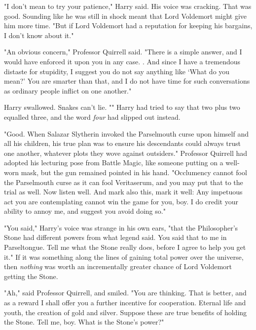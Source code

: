 "I don't mean to try your patience," Harry said. His voice was cracking. That 
was good. Sounding like he was still in shock meant that Lord Voldemort might 
give him more time. "But if Lord Voldemort had a reputation for keeping his 
bargains, I don't know about it."

"An obvious concern," Professor Quirrell said. "There is a simple answer, and I 
would have enforced it upon you in any case. . And 
since I have a tremendous distaste for stupidity, I suggest you do not say 
anything like `What do you mean?' You are smarter than that, and I do not have 
time for such conversations as ordinary people inflict on one another."

Harry swallowed. Snakes can't lie. "" Harry 
had tried to say that two plus two equalled three, and the word \emph{four} had 
slipped out instead.

"Good. When Salazar Slytherin invoked the Parselmouth curse upon himself and 
all his children, his true plan was to ensure his descendants could always 
trust one another, whatever plots they wove against outsiders." Professor 
Quirrell had adopted his lecturing pose from Battle Magic, like someone putting 
on a well-worn mask, but the gun remained pointed in his hand. "Occlumency 
cannot fool the Parselmouth curse as it can fool Veritaserum, and you may put 
that to the trial as well. Now listen well.  And mark also this, mark it well:  Any impetuous act you are 
contemplating cannot win the game for you, boy. I do credit your ability to 
annoy me, and suggest you avoid doing so."

"You said," Harry's voice was strange in his own ears, "that the Philosopher's 
Stone had different powers from what legend said. You said that to me in 
Parseltongue. Tell me what the Stone really does, before I agree to help you 
get it." If it was something along the lines of gaining total power over the 
universe, then \emph{nothing} was worth an incrementally greater chance of Lord 
Voldemort getting the Stone.

"Ah," said Professor Quirrell, and smiled. "You are thinking. That is better, 
and as a reward I shall offer you a further incentive for cooperation. Eternal 
life and youth, the creation of gold and silver. Suppose these are true 
benefits of holding the Stone. Tell me, boy. What is the Stone's power?"


